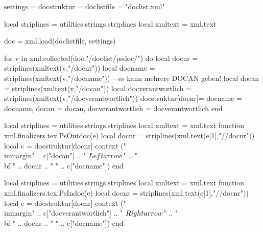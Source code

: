 

\startluacode
settings = {}
docstruktur = {}
doclistfile = "doclist.xml"

local striplines = utilities.strings.striplines
local xmltext = xml.text

doc = xml.load(doclistfile, settings)

for v in xml.collected(doc,"/doclist/psdoc/") do
 local docnr = striplines(xmltext(v,"/docnr"))
 local docname = striplines(xmltext(v,"/docname"))
 -- es kann mehrere DOCAN geben!
 local docan = striplines(xmltext(v,"/docan"))
 local docverantwortlich = striplines(xmltext(v,"/docverantwortlich"))
 docstruktur[docnr]={
   docname = docname,
   docan = docan,
   docverantwortlich = docverantwortlich
 }
end
\stopluacode

\startluacode
local striplines = utilities.strings.striplines
local xmltext = xml.text
function xml.finalizers.tex.PsOutdoc(e)
    local docnr = striplines(xml.text(e[1],"//docnr"))
    local c = docstruktur[docnr]
    context ("\\inmargin{" .. c["docan"] .. " $\\Leftarrow$}" .. "{\\bf " .. docnr .. "} " .. c["docname"])
end
\stopluacode

\startluacode
local striplines = utilities.strings.striplines
local xmltext = xml.text
function xml.finalizers.tex.PsIndoc(e)
    local docnr = striplines(xml.text(e[1],"//docnr"))
    local c = docstruktur[docnr]
    context ("\\inmargin{" .. c["docverantwortlich"] .. " $\\Rightarrow$}" .. "{\\bf " .. docnr .. "} " .. c["docname"])
end
\stopluacode

\language[de]
\setbreakpoints[compound]

\setuphyphenation[method=expanded]

\setuppapersize [A4,landscape][A4,landscape]
\setuplayout    [width=middle,  backspace=2in, cutspace=1in, leftmargin=1.5in,
                 height=middle, topspace=0.75in, bottomspace=0.75in]

\setuppagenumbering[location={footer,right}]

\setupheader[text][start]
\setupfooter[text][start]

